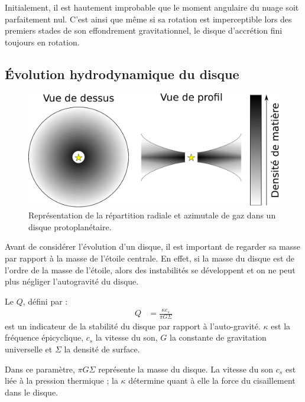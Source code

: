 Initialement, il est hautement improbable que le moment angulaire du nuage soit parfaitement nul. C'est ainsi que même si sa rotation est imperceptible lors des premiers stades de son effondrement gravitationnel, le disque d'accrétion fini toujours en rotation. 

\subsection{Évolution hydrodynamique du disque}
\begin{figure}[htbp]
\centering
\includegraphics[width=0.6\linewidth]{figure/disk_scheme.pdf}
\caption{Représentation de la répartition radiale et azimutale de gaz dans un disque protoplanétaire.}\label{fig:disk_scheme}
\end{figure}

Avant de considérer l'évolution d'un disque, il est important de regarder sa masse par rapport à la masse de l'étoile centrale. En effet, si la masse du disque est de l'ordre de la masse de l'étoile, alors des instabilités se développent et on ne peut plus négliger l'autogravité du disque. 

Le  $Q$, défini par \citep{toomre1964gravitational, goldreich1965gravitational}:
\begin{align}
Q &= \frac{\kappa c_{s}}{\pi G \Sigma}
\end{align}
est un indicateur de la stabilité du disque par rapport à l'auto-gravité. $\kappa$ est la fréquence épicyclique, $c_s$ la vitesse du son, $G$ la constante de gravitation universelle et $\Sigma$ la densité de surface. 

Dans ce paramètre, $\pi G \Sigma$ représente la masse du disque. La vitesse du son $c_{s}$ est liée à la pression thermique ; la  $\kappa$ détermine quant à elle la force du cisaillement dans le disque.

\bigskip

